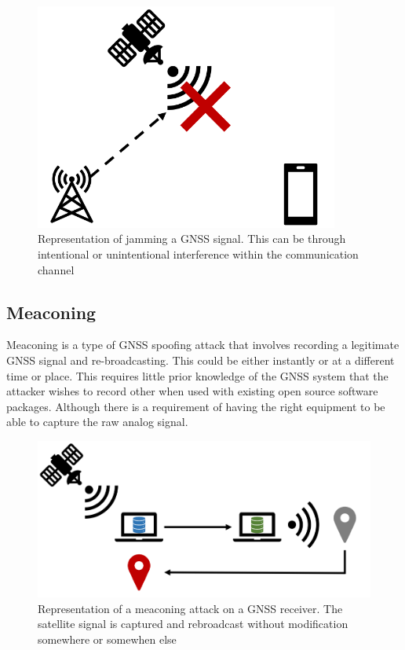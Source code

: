 \begin{figure}[h]
    \begin{centering}
        \includegraphics[width=10cm, keepaspectratio]{Figures/Jamming.png}
        \caption{Representation of jamming a GNSS signal. This can be through intentional or unintentional interference within the communication channel}
    \label{fig:jamming cartoon}
    \end{centering}
\end{figure}

\subsection{Meaconing}
Meaconing is a type of GNSS spoofing attack that involves recording a legitimate GNSS signal and re-broadcasting. This could be either instantly or at a different time or
place. This requires little prior knowledge of the GNSS system that the attacker wishes to record other when used with existing open source software packages. Although
there is a requirement of having the right equipment to be able to capture the raw analog signal.

\begin{figure}[h]
    \begin{centering}
        \includegraphics[width=12cm, keepaspectratio]{Figures/Meaconing.png}
        \caption{Representation of a meaconing attack on a GNSS receiver. The satellite signal is captured and rebroadcast without modification somewhere or somewhen else}
    \label{fig:meaconing cartoon}
    \end{centering}
\end{figure}

